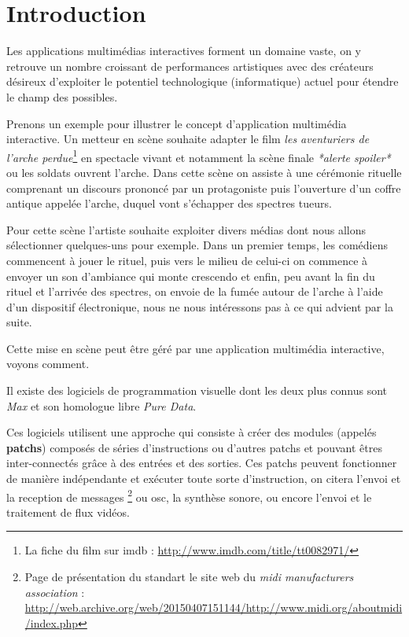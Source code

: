 \chapter*{Introduction}

Les applications multimédias interactives forment un domaine vaste, on y retrouve un nombre croissant de performances artistiques avec des créateurs désireux d'exploiter le potentiel technologique (informatique) actuel pour étendre le champ des possibles.

Prenons un exemple pour illustrer le concept d'application multimédia interactive. Un metteur en scène souhaite adapter le film \emph{les aventuriers de l'arche perdue}\footnote{La fiche du film sur imdb : \url{http://www.imdb.com/title/tt0082971/}} en spectacle vivant et notamment la scène finale \emph{*alerte spoiler*} ou les soldats ouvrent l'arche. Dans cette scène on assiste à une cérémonie rituelle comprenant un discours prononcé par un protagoniste puis l'ouverture d'un coffre antique appelée l'arche, duquel vont s'échapper des spectres tueurs.

Pour cette scène l'artiste souhaite exploiter divers médias dont nous allons sélectionner quelques-uns pour exemple.
%
Dans un premier temps, les comédiens commencent à jouer le rituel, puis vers le milieu de celui-ci on commence à envoyer un son d'ambiance qui monte crescendo et enfin, peu avant la fin du rituel et l'arrivée des spectres, on envoie de la fumée autour de l'arche à l'aide d'un dispositif électronique, nous ne nous intéressons pas à ce qui advient par la suite.

Cette mise en scène  peut être géré par une application multimédia interactive, voyons comment.


Il existe des logiciels de programmation visuelle\cite{Cycling742015}\cite{Pure2015} dont les deux plus connus sont \emph{Max} et son homologue libre \emph{Pure Data}.

Ces logiciels utilisent une approche qui consiste à créer des modules (appelés \textbf{\glspl{patch}}) composés de séries d'instructions ou d'autres \glspl{patch} et pouvant êtres inter-connectés grâce à des entrées et des sorties.
%
Ces patchs peuvent fonctionner de manière indépendante et exécuter toute sorte d'instruction, on citera l'envoi et la reception de messages \midi{}\footnote{Page de présentation du standart \midi{} le site web du \emph{midi manufacturers association} : \url{http://web.archive.org/web/20150407151144/http://www.midi.org/aboutmidi/index.php}} ou \acrfull{osc}\cite{osc2002conf}, la synthèse sonore, ou encore l'envoi et le traitement de flux vidéos.

